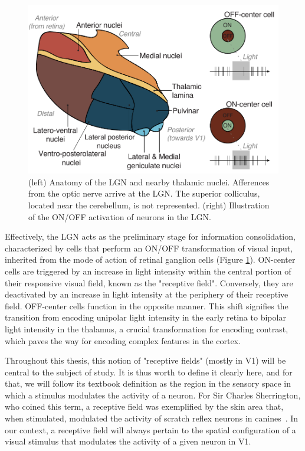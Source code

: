 \begin{figure}[h!tbp]
\vspace{0.5cm}
\centering
\includegraphics[width=.9\textwidth]{fig/chap2_fig_lgn.pdf}
\caption[Illustration of the \gls{LGN} and nearby thalamic nuclei.]{(left) Anatomy of the \gls{LGN} and nearby thalamic nuclei. Afferences from the optic nerve arrive at the \gls{LGN}. The superior colliculus, located near the cerebellum, is not represented. (right) Illustration of the ON/OFF activation of neurons in the \gls{LGN}.}
\label{fig_chap2_vision_lgn}
\end{figure}

Effectively, the \gls{LGN} acts as the preliminary stage for information consolidation, characterized by cells that perform an ON/OFF transformation of visual input, inherited from the mode of action of retinal ganglion cells (Figure \ref{fig_chap2_vision_lgn}). ON-center cells are triggered by an increase in light intensity within the central portion of their responsive visual field, known as the "receptive field". Conversely, they are deactivated by an increase in light intensity at the periphery of their receptive field. OFF-center cells function in the opposite manner. This shift signifies the transition from encoding unipolar light intensity in the early retina to bipolar light intensity in the thalamus, a crucial transformation for encoding contrast, which paves the way for encoding complex features in the cortex. 

Throughout this thesis, this notion of "receptive fields" (mostly in \gls{V1}) will be central to the subject of study. It is thus worth to define it clearly here, and for that, we will follow its textbook definition as the region in the sensory space in which a stimulus modulates the activity of a neuron. For Sir Charles Sherrington, who coined this term, a receptive field was exemplified by the skin area that, when stimulated, modulated the activity of scratch reflex neurons in canines~\cite{sherrington1906observations}. In our context, a receptive field will always pertain to the spatial configuration of a visual stimulus that modulates the activity of a given neuron in \gls{V1}.

